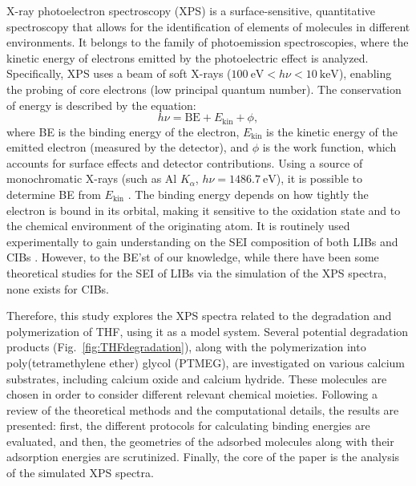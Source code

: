 \documentclass[journal=jpccck,manuscript=article]{achemso}
\begin{document}
X-ray photoelectron spectroscopy (XPS) is a surface-sensitive, quantitative spectroscopy that allows for the identification of elements of molecules in different environments. It belongs to the family of photoemission spectroscopies, where the kinetic energy of electrons emitted by the photoelectric effect is analyzed. Specifically, XPS uses a beam of soft X-rays ($\SI{100}{\electronvolt} < h\nu < \SI{10}{\kilo\electronvolt}$), enabling the probing of core electrons (low principal quantum number).\cite{stevieIntroductionXrayPhotoelectron2020} The conservation of energy is described by the equation:
\begin{equation}
	h\nu = \text{BE} + E_{\text{kin}} + \phi, \label{eq:xps}
\end{equation}
where BE is the binding energy of the electron, $E_{\text{kin}}$ is the kinetic energy of the emitted electron (measured by the detector), and $\phi$ is the work function, which accounts for surface effects and detector contributions. Using a source of monochromatic X-rays (such as Al $K_\alpha$, $h\nu = \SI{1486.7}{\electronvolt}$), it is possible to determine BE from $E_{\text{kin}}$ \cite{stevieIntroductionXrayPhotoelectron2020}. The binding energy depends on how tightly the electron is bound in its orbital, making it sensitive to the oxidation state and to the chemical environment of the originating atom. It is routinely used experimentally to gain understanding on the SEI composition of both LIBs and CIBs \cite{forero-saboyaUnderstandingNaturePassivation2020a,songElectrolyteOptimizationInterphase2022,bodinBoronBasedFunctionalAdditives2023,melemedImpactDifferentialCa22023,linDecipheringDynamicInterfacial2024}. However, to the BE'st of our knowledge, while there have been some theoretical studies for the SEI of LIBs via the simulation of the XPS spectra\cite{ebadiInsightsLiMetalOrganic2019}, none exists for CIBs.

Therefore, this study explores the XPS spectra related to the degradation and polymerization of THF, using it as a model system. Several potential degradation products (Fig.~\ref{fig:THFdegradation}), along with the polymerization into poly(tetramethylene ether) glycol (PTMEG), are investigated on various calcium substrates, including calcium oxide and calcium hydride. These molecules are chosen in order to consider different relevant chemical moieties. Following a review of the theoretical methods and the computational details, the results are presented: first, the different protocols for calculating binding energies are evaluated, and then, the geometries of the adsorbed molecules along with their adsorption energies are scrutinized. Finally, the core of the paper is the analysis of the simulated XPS spectra.
\end{document}
